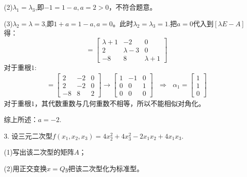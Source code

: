 \documentclass{article}
\begin{document}
\begin{jie}
(2)$\lambda_1=\lambda_3$,即$-1=1-a,a=2>0$，不符合题意。

(3)$\lambda_{2}=\lambda=3$,即$1+a=1-a,a=0$。此时$\lambda_{2}=\lambda_3=1$.把$a=0$代入到$[\lambda E-A]$得：
\begin{equation*}
[\lambda E-A]=
\begin{bmatrix}
  \lambda+1 & -2 & 0\\
  2 & \lambda-3 & 0\\
 -8 & 8 & \lambda+1
\end{bmatrix}
\end{equation*}
对于重根$1$:
\begin{align*}
[\lambda E-A]=
\begin{bmatrix}
  2 & -2 & 0\\
  2 & -2 & 0\\
 -8 & 8 & 2
\end{bmatrix}
\rightarrow
\begin{bmatrix}
  1 & -1 & 0\\
  0 & 0 & 1\\
 0 & 0 & 0
\end{bmatrix}~~~\Rightarrow~~~\alpha_1=
\begin{bmatrix}
1\\
1\\
0
\end{bmatrix}
\end{align*}
对于重根$1$，其代数重数与几何重数不相等，所以不能相似对角化。

综上所述：$a=-2$.
\end{jie}

3. 设三元二次型$f(x_{1},x_{2},x_{3})=4x_{2}^{2}+4x_{3}^{2}-2x_{1}x_{2}+4x_{1}x_{3}$.

(1)写出该二次型的矩阵$A$；

(2)用正交变换$x=Qy$把该二次型化为标准型。
\end{document}
